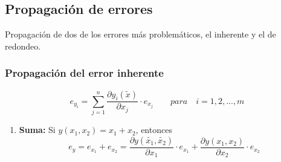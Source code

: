 \documentclass[../main.tex]{subfiles}
\begin{document}
    \subsection{Propagación de errores}
        Propagación de dos de los errores más problemáticos, el inherente y el de redondeo.


        \subsubsection{Propagación del error inherente}
            \begin{equation}
                e_{y_i} = \sum_{j=1}^{n}  \frac{\partial y_i(\widetilde{x}) }{\partial x_j} \cdot e_{x_j} \quad  \quad para \quad i = 1,2,...,m
            \end{equation}

            \begin{enumerate}
                \item \textbf{Suma:} Si $y(x_1, x_2) = x_1 + x_2$, entonces
                    \begin{equation}
                        e_y = e_{x_1} + e_{x_2} = \frac{\partial y(\widetilde{x_1}, \widetilde{x_2})}{\partial x_1} \cdot e_{x_1} + \frac{\partial y(x_1, x_2)}{\partial x_2} \cdot e_{x_2} 
                    \end{equation}
            \end{enumerate}
        
\end{document}
